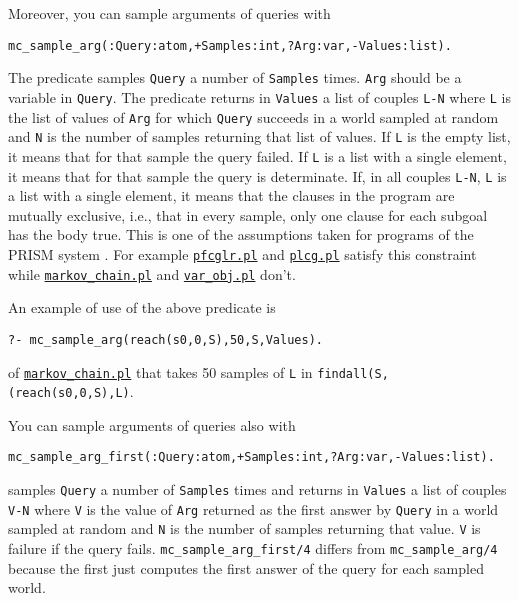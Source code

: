 Moreover, you can sample arguments of queries with
\begin{verbatim}
mc_sample_arg(:Query:atom,+Samples:int,?Arg:var,-Values:list).
\end{verbatim}
The predicate samples \verb|Query| a number of \verb|Samples| times. 
\verb|Arg| should be a variable in \verb|Query|.
The predicate returns in \verb|Values| a list of couples \verb|L-N| where
\verb|L| is the list of values of \verb|Arg| for which \verb|Query|
succeeds in a world sampled at random and \verb|N|
is the number of samples returning that list of values.
If \verb|L| is the empty list, it means that for that
sample the query failed. 
If \verb|L| is a list with a 
single element, it means that for that sample the query is 
determinate. 
If, in all couples \verb|L-N|, \verb|L| 
is a list with a 
single element, it means that the clauses in the program 
are mutually exclusive, i.e., that in every sample, only
one clause for each subgoal has the body true. This is one
of the assumptions taken for programs of the PRISM system \cite{DBLP:journals/jair/SatoK01}.
For example
\href{http://cplint.lamping.unife.it/example/inference/pfcglr.pl}{\texttt{pfcglr.pl}} and \href{http://cplint.lamping.unife.it/example/inference/plcg.pl}{\texttt{plcg.pl}} satisfy this constraint while
 \href{http://cplint.lamping.unife.it/example/inference/markov_chain.pl}{\texttt{markov\_chain.pl}} and \href{http://cplint.lamping.unife.it/example/inference/var_obj.pl}{\texttt{var\_obj.pl}} don't.


An example of use of the above predicate is
\begin{verbatim}
?- mc_sample_arg(reach(s0,0,S),50,S,Values). 
\end{verbatim}
of \href{http://cplint.lamping.unife.it/example/inference/markov_chain.pl}{\texttt{markov\_chain.pl}}
that takes 50 samples of \verb|L| in \verb|findall(S,(reach(s0,0,S),L)|.

You can sample arguments of queries also with
\begin{verbatim}
mc_sample_arg_first(:Query:atom,+Samples:int,?Arg:var,-Values:list).
\end{verbatim}
samples \verb|Query| a number of \verb|Samples| times 
and returns in \verb|Values| a list of couples \verb|V-N| where 
\verb|V| is the value of \verb|Arg| returned as the first answer by \verb|Query| in 
a world sampled at random and \verb|N| is the number of samples
returning that value.
\verb|V| is failure if the query fails.
\verb|mc_sample_arg_first/4| differs from \verb|mc_sample_arg/4| because the first just computes the first
answer of the query for each sampled world.

